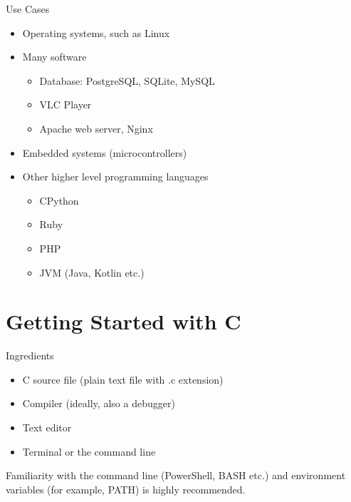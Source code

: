 \documentclass[12pt, aspectratio=169]{beamer}
\begin{document}
    \begin{frame}{Use Cases}
        \begin{itemize}
            \item Operating systems, such as Linux
            \item Many software
            \begin{itemize}
                \item Database: PostgreSQL, SQLite, MySQL
                \item VLC Player
                \item Apache web server, Nginx
            \end{itemize}
            \item Embedded systems (microcontrollers)
            \item Other higher level programming languages
            \begin{itemize}
                \item CPython
                \item Ruby
                \item PHP
                \item JVM (Java, Kotlin etc.)
            \end{itemize}
        \end{itemize}
    \end{frame}


    \section{Getting Started with C}

    \begin{frame}{Ingredients}
        \begin{itemize}
            \item C source file (plain text file with .c extension)
            \item Compiler (ideally, also a debugger)
            \item Text editor
            \item Terminal or the command line
        \end{itemize}

        Familiarity with the command line (PowerShell, BASH etc.) and environment variables (for example, PATH) is highly recommended.
    \end{frame}
\end{document}
